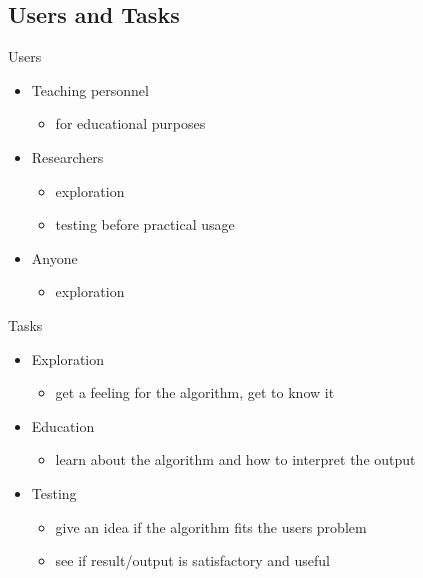 \documentclass[naustrian]{beamer}
\begin{document}
\subsection{Users and Tasks}

\begin{frame}{Users}
\begin{itemize}
 \item Teaching personnel
            \begin{itemize}
                \item for educational purposes
            \end{itemize}
  \item Researchers
            \begin{itemize}
                \item exploration
                \item testing before practical usage
            \end{itemize}
\item Anyone
            \begin{itemize}
                \item exploration
            \end{itemize}
  \end{itemize}
\end{frame}

\begin{frame}{Tasks}
\begin{itemize}
 \item Exploration
            \begin{itemize}
                \item get a feeling for the algorithm, get to know it
            \end{itemize}
 \item Education
  	\begin{itemize}
                \item learn about the algorithm and how to interpret the output
            \end{itemize}
  \item Testing
            \begin{itemize}
                \item give an idea if the algorithm fits the users problem
                \item see if result/output is satisfactory and useful
            \end{itemize}
  \end{itemize}
\end{frame}
\end{document}
